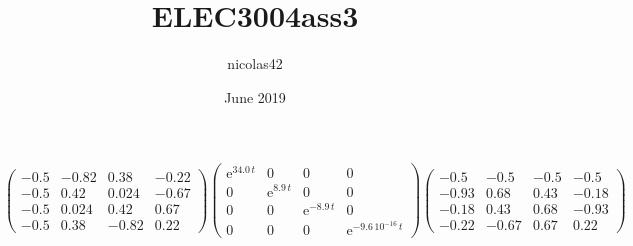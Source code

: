 \documentclass{article}
\title{ELEC3004ass3}
\author{nicolas42 }
\date{June 2019}
\begin{document}
\maketitle

\section{}



$$

\left(\begin{array}{cccc} -0.5 & -0.82 & 0.38 & -0.22\\ -0.5 & 0.42 & 0.024 & -0.67\\ -0.5 & 0.024 & 0.42 & 0.67\\ -0.5 & 0.38 & -0.82 & 0.22 \end{array}\right)
\left(\begin{array}{cccc} {\mathrm{e}}^{34.0\,t} & 0 & 0 & 0\\ 0 & {\mathrm{e}}^{8.9\,t} & 0 & 0\\ 0 & 0 & {\mathrm{e}}^{-8.9\,t} & 0\\ 0 & 0 & 0 & {\mathrm{e}}^{-9.6\,{10}^{-16}\,t} \end{array}\right)
\left(\begin{array}{cccc} -0.5 & -0.5 & -0.5 & -0.5\\ -0.93 & 0.68 & 0.43 & -0.18\\ -0.18 & 0.43 & 0.68 & -0.93\\ -0.22 & -0.67 & 0.67 & 0.22 \end{array}\right)






$$
\end{document}
